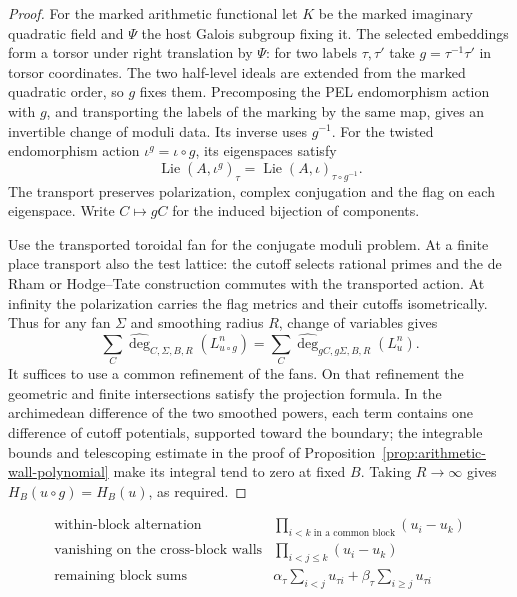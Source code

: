 \begin{proof}
For the marked arithmetic functional let \(K\) be the marked imaginary quadratic field and \(\Psi\) the host Galois subgroup fixing it. The selected embeddings form a torsor under right translation by \(\Psi\): for two labels \(\tau,\tau'\) take \(g=\tau^{-1}\tau'\) in torsor coordinates. The two half-level ideals are extended from the marked quadratic order, so \(g\) fixes them. Precomposing the PEL endomorphism action with \(g\), and transporting the labels of the marking by the same map, gives an invertible change of moduli data. Its inverse uses \(g^{-1}\). For the twisted endomorphism action \(\iota^g=\iota\circ g\), its eigenspaces satisfy
\[
   \operatorname{Lie}(A,\iota^g)_\tau
           =\operatorname{Lie}(A,\iota)_{\tau\circ g^{-1}} .
\]
The transport preserves polarization, complex conjugation and the flag on each eigenspace. Write \(C\mapsto gC\) for the induced bijection of components.

Use the transported toroidal fan for the conjugate moduli problem. At a finite place transport also the test lattice: the cutoff selects rational primes and the de Rham or Hodge--Tate construction commutes with the transported action. At infinity the polarization carries the flag metrics and their cutoffs isometrically. Thus for any fan \(\Sigma\) and smoothing radius \(R\), change of variables gives
\[
 \sum_C\widehat{\deg}_{C,\Sigma,B,R}(L_{u\circ g}^{n})
       =\sum_C\widehat{\deg}_{gC,g\Sigma,B,R}(L_u^n).
\]
It suffices to use a common refinement of the fans. On that refinement the geometric and finite intersections satisfy the projection formula. In the archimedean difference of the two smoothed powers, each term contains one difference of cutoff potentials, supported toward the boundary; the integrable bounds and telescoping estimate in the proof of Proposition~\ref{prop:arithmetic-wall-polynomial} make its integral tend to zero at fixed \(B\). Taking \(R\to\infty\) gives \(H_B(u\circ g)=H_B(u)\), as required.
\end{proof}

\begin{construction}
\[
\begin{array}{ll}
\text{within-block alternation}&\prod_{i<k\text{ in a common block}}(u_i-u_k)\\
\text{vanishing on the cross-block walls}&\prod_{i<j\le k}(u_i-u_k)\\ \hline
\text{remaining block sums}&\alpha_\tau\!\sum_{i<j}u_{\tau i}
                      +\beta_\tau\!\sum_{i\ge j}u_{\tau i}
\end{array}
\]
\caption{How the vanishing conditions factor a wall polynomial. At each embedding the last quotient is linear and symmetric within each of the two blocks.}\label{fig:wall-kernel-steps}
\end{construction}

